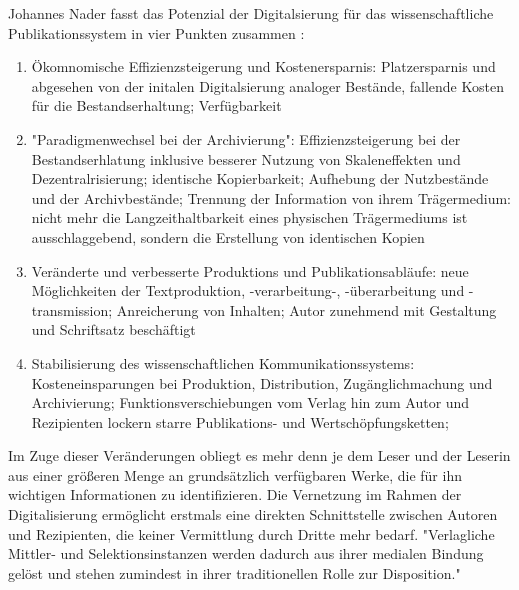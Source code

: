 Johannes Nader fasst das Potenzial der Digitalsierung für das wissenschaftliche Publikationssystem in vier Punkten zusammen \cite{naeder_2010_open}:
\begin{enumerate}
\item Ökomnomische Effizienzsteigerung und Kostenersparnis: Platzersparnis und abgesehen von der initalen Digitalsierung analoger Bestände, fallende Kosten für die Bestandserhaltung; Verfügbarkeit
\item "Paradigmenwechsel bei der Archivierung": Effizienzsteigerung bei der Bestandserhlatung inklusive besserer Nutzung von Skaleneffekten und Dezentralrisierung; identische Kopierbarkeit; Aufhebung der Nutzbestände und der Archivbestände; Trennung der Information von ihrem Trägermedium: nicht mehr die Langzeithaltbarkeit eines physischen Trägermediums ist ausschlaggebend, sondern die Erstellung von identischen Kopien
\item Veränderte und verbesserte Produktions und Publikationsabläufe: neue Möglichkeiten der Textproduktion, -verarbeitung-, -überarbeitung und -transmission; Anreicherung von Inhalten; Autor zunehmend mit Gestaltung und Schriftsatz beschäftigt
\item Stabilisierung des wissenschaftlichen Kommunikationssystems: Kosteneinsparungen bei Produktion, Distribution, Zugänglichmachung und Archivierung; Funktionsverschiebungen vom Verlag hin zum Autor und Rezipienten lockern starre Publikations- und Wertschöpfungsketten;
\end{enumerate}

Im Zuge dieser Veränderungen obliegt es mehr denn je dem Leser und der Leserin aus einer größeren Menge an grundsätzlich verfügbaren Werke, die für ihn wichtigen Informationen zu identifizieren. Die Vernetzung im Rahmen der Digitalisierung ermöglicht erstmals eine direkten Schnittstelle zwischen Autoren und Rezipienten, die keiner Vermittlung durch Dritte mehr bedarf. "Verlagliche Mittler- und Selektionsinstanzen werden dadurch aus ihrer medialen Bindung gelöst und stehen zumindest in ihrer traditionellen Rolle zur Disposition." \cite{naeder_2010_open}

